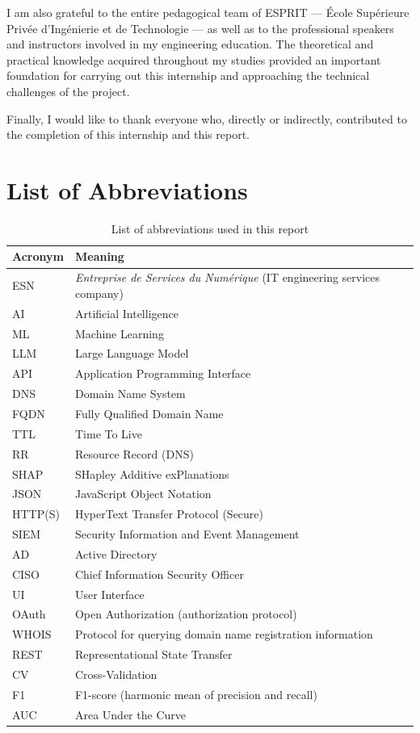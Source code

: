 \documentclass[12pt,a4paper]{report}
\begin{document}
I am also grateful to the entire pedagogical team of ESPRIT --- École Supérieure Privée d'Ingénierie et de Technologie --- as well as to the professional speakers and instructors involved in my engineering education. The theoretical and practical knowledge acquired throughout my studies provided an important foundation for carrying out this internship and approaching the technical challenges of the project.

Finally, I would like to thank everyone who, directly or indirectly, contributed to the completion of this internship and this report.

\chapter*{List of Abbreviations}
\begin{table}[htbp]
\centering
\begin{tabular}{@{}>{\raggedright\arraybackslash}p{2.5cm}>{\raggedright\arraybackslash}p{10.5cm}@{}}
\toprule
\textbf{Acronym} & \textbf{Meaning} \\
\midrule
ESN & \emph{Entreprise de Services du Num\'erique} (IT engineering services company) \\
AI & Artificial Intelligence \\
ML & Machine Learning \\
LLM & Large Language Model \\
API & Application Programming Interface \\
DNS & Domain Name System \\
FQDN & Fully Qualified Domain Name \\
TTL & Time To Live \\
RR & Resource Record (DNS) \\
SHAP & SHapley Additive exPlanations \\
JSON & JavaScript Object Notation \\
HTTP(S) & HyperText Transfer Protocol (Secure) \\
SIEM & Security Information and Event Management \\
AD & Active Directory \\
CISO & Chief Information Security Officer \\
UI & User Interface \\
OAuth & Open Authorization (authorization protocol) \\
WHOIS & Protocol for querying domain name registration information \\
REST & Representational State Transfer \\
CV & Cross-Validation \\
F1 & F1-score (harmonic mean of precision and recall) \\
AUC & Area Under the Curve \\
\bottomrule
\end{tabular}
\caption{List of abbreviations used in this report}
\end{table}
\end{document}
